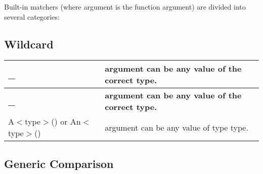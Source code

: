 Built-\/in matchers (where {\ttfamily argument} is the function argument) are divided into several categories\+:

\subsection*{Wildcard}

\tabulinesep=1mm
\begin{longtabu}spread 0pt [c]{*{2}{|X[-1]}|}
\hline
\cellcolor{\tableheadbgcolor}\textbf{ {\ttfamily \+\_\+}  }&\cellcolor{\tableheadbgcolor}\textbf{ {\ttfamily argument} can be any value of the correct type.   }\\
\endfirsthead
\hline
\endfoot
\hline
\cellcolor{\tableheadbgcolor}\textbf{ {\ttfamily \+\_\+}  }&\cellcolor{\tableheadbgcolor}\textbf{ {\ttfamily argument} can be any value of the correct type.   }\\
\endhead
{\ttfamily A$<$type$>$()} or {\ttfamily An$<$type$>$()}  &{\ttfamily argument} can be any value of type {\ttfamily type}.   \\
\end{longtabu}


\subsection*{Generic Comparison}


